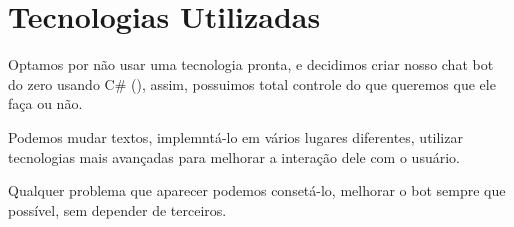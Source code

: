 \chapter{Tecnologias Utilizadas}
    Optamos por não usar uma tecnologia pronta, e decidimos criar nosso chat bot do zero usando C\# (), assim, possuimos total controle do que queremos que ele faça ou não.
    \par Podemos mudar textos, implemntá-lo em vários lugares diferentes, utilizar tecnologias mais avançadas para melhorar a interação dele com o usuário.
    \par Qualquer problema que aparecer podemos consetá-lo, melhorar o bot sempre que possível, sem depender de terceiros.